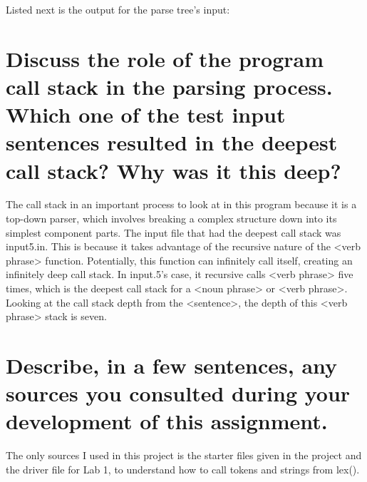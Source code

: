\documentclass[12pt]{article}
\begin{document}
Listed next is the output for the parse tree's input:


\section{Discuss the role of the program call stack in the parsing process. Which one of the test input sentences resulted in the deepest call stack? Why was it this deep?}

The call stack in an important process to look at in this program because it is a top-down parser, which involves breaking a complex structure down into its simplest component parts. 
The input file that had the deepest call stack was input5.in. 
This is because it takes advantage of the recursive nature of the <verb phrase> function.
Potentially, this function can infinitely call itself, creating an infinitely deep call stack. 
In input.5's case, it recursive calls <verb phrase> five times, which is the deepest call stack for a <noun phrase> or <verb phrase>.
Looking at the call stack depth from the <sentence>, the depth of this <verb phrase> stack is seven. 

\section{Describe, in a few sentences, any sources you consulted during your development of this assignment.}

The only sources I used in this project is the starter files given in the project and the driver file for Lab 1, to understand how to call tokens and strings from lex(). 
\end{document}
